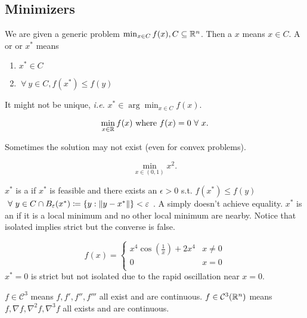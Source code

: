 \documentclass[class=article,crop=false]{standalone}
\begin{document}
\subsection{Minimizers}

We are given a generic problem $ \min_{x \in C} f(x), C \subseteq \mathbb{R}^{n}$. Then a  $ x$ means  $ x \in C$. A  or  or   $ x^* $ means
\begin{enumerate}[label=\arabic*)]
	\item $ x^* \in C$
	\item $ \ \forall \ y \in C, f(x^* )\leq f(y)$
\end{enumerate}
It might not be unique, \emph{i.e.} $ x^* \in \arg \min_{x \in C} f(x)$.
\begin{eg}
\[
	\min_{x \in \mathbb{R}} f(x) \text{ where } f(x)=0 \ \forall \ x 
.\] 

\end{eg}
Sometimes the solution may not exist (even for convex problems).
\begin{eg}
\[
	\min_{ x \in (0,1)} x^2 
.\] 
\end{eg}

$ x^* $ is a  if $ x^* $ is feasible and there exists an $ \epsilon>0$ s.t. $ f(x^* )\leq f(y)$ $ \ \forall \ y \in C \cap B_{ \varepsilon} ( x^*  ) \coloneqq \{y: {\left\lVert{ y-x^* }\right\rVert} \} < \varepsilon$ . A  simply doesn't achieve equality. $ x^* $ is an  if it is a local minimum and no other local minimum are nearby. Notice that isolated implies strict but the converse is false.

\begin{eg}
\begin{equation*}
	f(x)=
\begin{cases}
	x^{4} \cos \left( \frac{1}{x} \right) +2x^{4} & x\neq 0\\
	0 & x=0\\
\end{cases}
\end{equation*}
$ x^* =0 $ is strict but not isolated due to the rapid oscillation near $ x=0$.
\end{eg}

\begin{notation}
	$ f \in \mathcal{ C}^3$ means $f,f',f'',f''' $ all exist and are continuous. $ f \in \mathcal{ C}^3( \mathbb{R}^{n})$ means $ f, \nabla f, \nabla^2 f, \nabla^3 f$ all exists and are continuous.
\end{notation}
\end{document}
